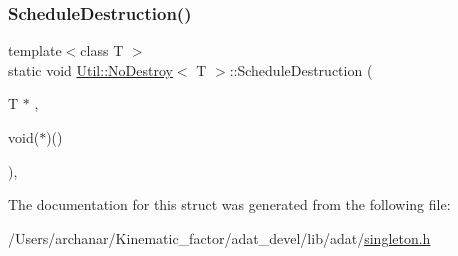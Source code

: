 \subsubsection{\texorpdfstring{ScheduleDestruction()}{ScheduleDestruction()}\hspace{0.1cm}{\footnotesize\ttfamily [2/2]}}
{\footnotesize\ttfamily template$<$class T $>$ \\
static void \mbox{\hyperlink{structUtil_1_1NoDestroy}{Util\+::\+No\+Destroy}}$<$ T $>$\+::Schedule\+Destruction (\begin{DoxyParamCaption}\item[{T $\ast$}]{,  }\item[{void($\ast$)()}]{ }\end{DoxyParamCaption})\hspace{0.3cm}{\ttfamily [inline]}, {\ttfamily [static]}}



The documentation for this struct was generated from the following file\+:\begin{DoxyCompactItemize}
\item 
/\+Users/archanar/\+Kinematic\+\_\+factor/adat\+\_\+devel/lib/adat/\mbox{\hyperlink{lib_2adat_2singleton_8h}{singleton.\+h}}\end{DoxyCompactItemize}
